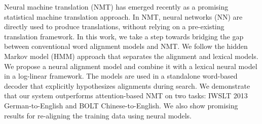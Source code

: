 Neural machine translation (NMT) has emerged recently as a promising statistical machine translation approach. In NMT, neural networks (NN) are directly used to produce translations, without relying on a pre-existing translation framework. In this work, we take a step towards bridging the gap between conventional word alignment models and NMT. We follow the hidden Markov model (HMM) approach that separates the alignment and lexical models. We propose a neural alignment model and combine it with a lexical neural model in a log-linear framework. The models are used in a standalone word-based decoder that explicitly hypothesizes alignments during search. We demonstrate that our system outperforms attention-based NMT on two tasks: IWSLT 2013 German-to-English and BOLT Chinese-to-English. We also show promising results for re-aligning the training data using neural models.
